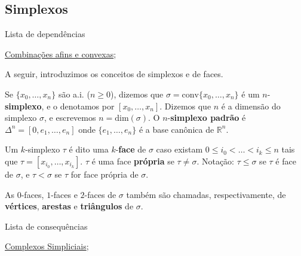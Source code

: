 \subsection{Simplexos}
\label{simplexo-def}
\begin{titlemize}{Lista de dependências}
	\item \hyperref[comb-afim-convexa-def]{Combinações afins e convexas};\\ %
\end{titlemize}

A seguir, introduzimos os conceitos de simplexos e de faces.

\begin{defi}[Simplexos]
    Se $\{x_0,\ldots,x_n\}$ são a.i. ($n \geq 0$), dizemos que $\sigma = \text{conv}\{x_0,\ldots,x_n\}$ é um $n$-\textbf{simplexo}, e o denotamos por $[x_0,\ldots, x_n]$. Dizemos que $n$ é a dimensão do simplexo $\sigma$, e escrevemos $n = \text{dim}(\sigma)$. O $n$-\textbf{simplexo padrão} é $\Delta^n = [0, e_1, \ldots, e_n]$ onde $\{e_1,\ldots, e_n\}$ é a base canônica de $\mathbb{R}^n$.

    Um $k$-simplexo $\tau$ é dito uma $k$-\textbf{face} de $\sigma$ caso existam $0 \leq i_0 < \ldots < i_k \leq n$ tais que $\tau = [x_{i_0}, \ldots, x_{i_k}]$. $\tau$ é uma face \textbf{própria} se $\tau \neq \sigma$. Notação: $\tau \leq \sigma$ se $\tau$ é face de $\sigma$, e $\tau < \sigma$ se $\tau$ for face própria de $\sigma$.

    As $0$-faces, $1$-faces e $2$-faces de $\sigma$ também são chamadas, respectivamente, de \textbf{vértices}, \textbf{arestas} e \textbf{triângulos} de $\sigma$.
\end{defi}

\begin{titlemize}{Lista de consequências}
	\item \hyperref[complexo-simplicial-def]{Complexos Simpliciais};\\ %
\end{titlemize}

